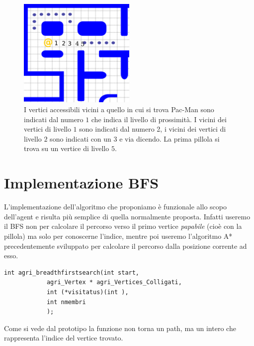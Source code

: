 \documentclass[8pt]{book}
\begin{document}
\begin{figure}
  \centering
  \includegraphics[width=0.5\textwidth]{img/DSF_select.png}
  \caption{I vertici accessibili vicini a quello in cui si trova Pac-Man sono indicati dal numero $1$ che indica il livello di prossimità. I vicini dei vertici di livello $1$ sono indicati dal numero 2, i vicini dei vertici di livello $2$ sono indicati con un $3$ e via dicendo. La prima pillola si trova su un vertice di livello $5$.}
  \label{DSF_select}
\end{figure}


\section{Implementazione BFS}

L'implementazione dell'algoritmo che proponiamo è funzionale allo scopo dell'agent e risulta più semplice di quella normalmente proposta. Infatti useremo il BFS non per calcolare il percorso verso il primo vertice \emph{papabile} (cioè con la pillola) ma solo per conoscerne l'indice, mentre poi useremo l'algoritmo A* precedentemente sviluppato per calcolare il percorso dalla posizione corrente ad esso.

\begin{spacing}{0.9}
  \begin{small}
    \begin{tcolorbox}
\begin{verbatim}
int agri_breadthfirstsearch(int start, 
		    agri_Vertex * agri_Vertices_Colligati,
		    int (*visitatus)(int ),
		    int nmembri
		    );
\end{verbatim}
  \end{tcolorbox}
    \end{small}
      \end{spacing}

 Come si vede dal prototipo la funzione non torna un path, ma un intero che rappresenta l'indice del vertice trovato.
\end{document}
